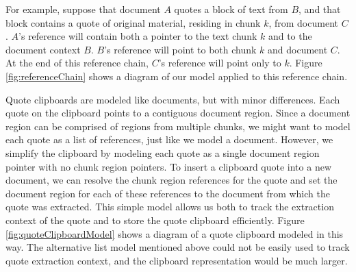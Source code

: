 \documentclass{acm_proc_article-sp}
\begin{document}
For example, suppose that document $A$ quotes a block of text from $B$, and that block contains a quote of original material, residing in chunk $k$, from document $C$.  
$A$'s reference will contain both a pointer to the text chunk $k$ and to the document context $B$.  
$B$'s reference will point to both chunk $k$ and document $C$.  
At the end of this reference chain, $C$'s reference will point only to $k$.
Figure \ref{fig:referenceChain} shows a diagram of our model applied to this reference chain.








Quote clipboards are modeled like documents, but with minor differences.
Each quote on the clipboard points to a contiguous document region.
Since a  document region can be comprised of regions from multiple chunks, we might want to model each quote as a list of references, just like we model a document.
However, we simplify the clipboard by modeling each quote as a single document region pointer with no chunk region pointers.
To insert a clipboard quote into a new document, we can resolve the chunk region references for the quote and set the document region for each of these references to the document from which the quote was extracted.
This simple model allows us both to track the extraction context of the quote and to store the quote clipboard efficiently.
Figure \ref{fig:quoteClipboardModel} shows a diagram of a quote clipboard modeled in this way.
The alternative list model mentioned above could not be easily used to track quote extraction context, and the clipboard representation would be much larger.
\end{document}
